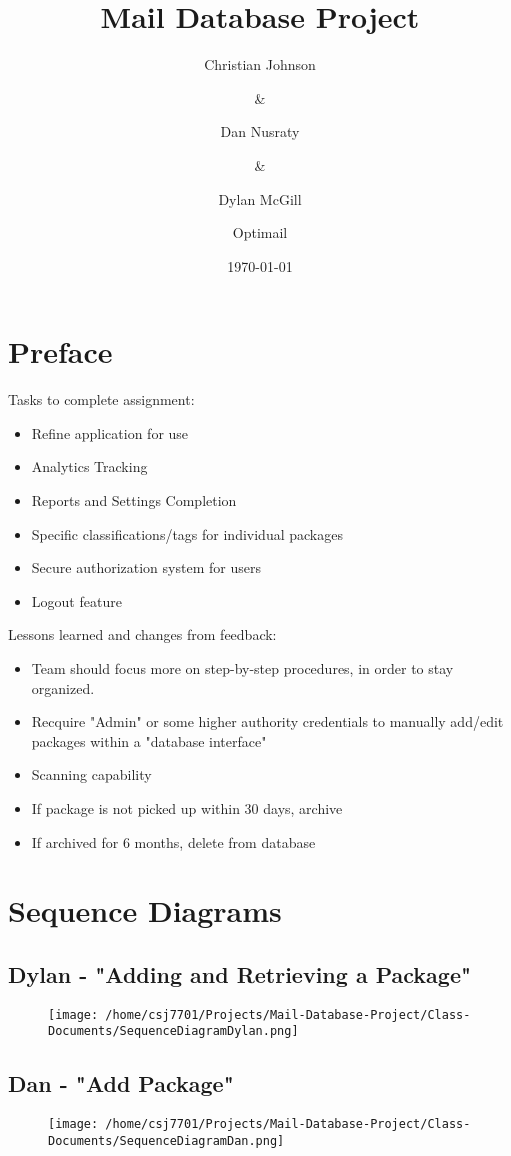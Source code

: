\documentclass[11pt]{article}
\author{Christian Johnson\and\&\and Dan Nusraty\and\&\and Dylan McGill\and\newline Optimail}
\date{\today}
\title{Mail Database Project}
\begin{document}
\maketitle
\newpage
\section*{Preface}
\label{sec:org00ce873}
Tasks to complete assignment:
\begin{itemize}
\item Refine application for use
\item Analytics Tracking
\item Reports and Settings Completion
\item Specific classifications/tags for individual packages
\item Secure authorization system for users
\item Logout feature
\end{itemize}


Lessons learned and changes from feedback:
\begin{itemize}
\item Team should focus more on step-by-step procedures, in order to stay organized.
\item Recquire "Admin" or some higher authority credentials to manually add/edit packages within a "database interface"
\item Scanning capability
\item If package is not picked up within 30 days, archive
\item If archived for 6 months, delete from database
\end{itemize}


\section*{Sequence Diagrams}
\label{sec:org0c3b3c1}
\subsection*{Dylan - "Adding and Retrieving a Package"}
\label{sec:orgc94fa30}
\begin{figure}[htbp]
\centering
\texttt{[image: /home/csj7701/Projects/Mail-Database-Project/Class-Documents/SequenceDiagramDylan.png]}
\bicaption{---}
\end{figure}
\newpage
\subsection*{Dan - "Add Package"}
\label{sec:org67ceb95}
\begin{figure}[htbp]
\centering
\texttt{[image: /home/csj7701/Projects/Mail-Database-Project/Class-Documents/SequenceDiagramDan.png]}
\bicaption{---}
\end{figure}
\end{document}
